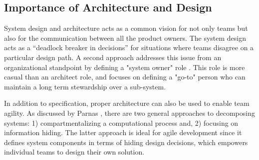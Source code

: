 \subsection{Importance of Architecture and Design}\label{sec:imp_of_dsgn}

System design and architecture acts as a common vision for not only teams but also for the communication between all the product owners.
The system design acts as a “deadlock breaker in decisions” \cite{architecureRole_article} for situations where teams disagree on a particular design path.
A second approach addresses this issue from an organizational standpoint by defining a "system owner" role \cite{kniberg12}.
This role is more casual than an architect role, and focuses on defining a "go-to" person who can maintain a long term stewardship over a sub-system. 

In addition to specification, proper architecture can also be used to enable team agility.
As discussed by Parnas \cite{Parnas72}, there are two general approaches to decomposing systems: 1) compartmentalizing a computational process and, 2) focusing on information hiding.
The latter approach is ideal for agile development since it defines system components in terms of hiding design decisions, which empowers individual teams to design their own solution.